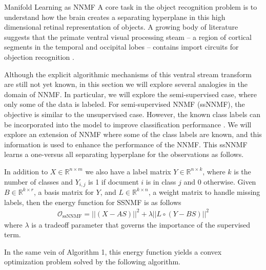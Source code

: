 \documentclass[12pt]{pom_thesis}
\begin{document}
\begin{chapter}{Manifold Learning as NNMF}
	A core task in the object recognition problem is to understand how the brain creates a separating hyperplane in this high dimensional retinal representation of objects. A growing body of literature suggests that the primate ventral visual processing steam -- a region of cortical segments in the temporal and occipital lobes -- contains import circuits for objection recognition \cite{gross1994inferior, dicarlo2012does, miyashita1993inferior, orban2008higher, rolls2000functions}. 
	
	Although the explicit algorithmic mechanisms of this ventral stream transform are still not yet known, in this section we will explore several analogies in the domain of NNMF. In particular, we will explore  the semi-supervised case, where only some of the data is labeled.  For semi-supervised NNMF (ssNNMF), the objective is similar to the unsupervised case. However, the known class labels can be incorporated into the model to improve classification performance \cite{lee2010semi}. We will explore an extension of NNMF where some of the class labels are known, and this information is used to enhance the performance of the NNMF. This ssNNMF  learns a one-versus all separating hyperplane for the observations \cite{lee2010semi} as follows.
	
   In addition to  $X \in \mathbb{R}^{n\times m}$ we also have a label matrix $Y \in \mathbb{R}^{n\times k}$, where $k$ is the number of classes and $Y_{i,j}$ is 1 if document $i$ is in class $j$ and 0 otherwise. 
	Given $B \in \mathbb{R}^{k \times r}$, a basis matrix for $Y$, and $L \in \mathbb{R}^{k \times n}$, a weight matrix to handle missing labels, then the energy function for SSNMF is as follows
\begin{align}
\label{O:ssMMMF}
\mathcal{O}_{\text{ssNNMF}} = ||(X-AS)||^2 + \lambda ||L \circ (Y-BS)||^2
\end{align}
	where $\lambda$ is a tradeoff parameter that governs the importance of the supervised term.
	
	In the same vein of Algorithm 1, this energy function yields a convex optimization problem solved by the following algorithm. 
	

\end{chapter}
\end{document}
